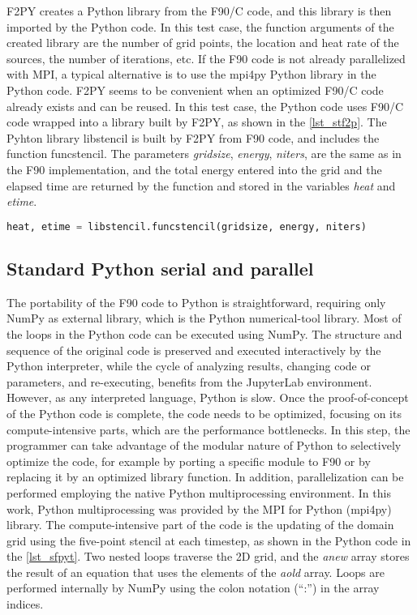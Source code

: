 F2PY creates a Python library from the F90/C code, and this library is then imported by the Python code. In this test case, the function arguments of the created library are the number of grid points, the location and heat rate of the sources, the number of iterations, etc. If the F90 code is not already parallelized with MPI, a typical alternative is to use the mpi4py Python library in the Python code. F2PY seems to be convenient when an optimized F90/C code already exists and can be reused. In this test case, the Python code uses F90/C code wrapped into a library built by F2PY, as shown in the \autoref {lst_stf2p}. The Pyhton library libstencil is built by F2PY from F90 code, and includes the function funcstencil. The parameters \textit {gridsize}, \textit {energy}, \textit {niters}, are the same as in the F90 implementation, and the total energy entered into the grid and the elapsed time are returned by the function and stored in the variables \textit {heat} and \textit {etime}.

\begin{lstlisting}[float=hbt, language=Python, label={lst_stf2p}, caption={Compute-intensive part of the F2PY implementation, in the main Python code.}]
heat, etime = libstencil.funcstencil(gridsize, energy, niters)
\end{lstlisting}

%
%
%
\subsection{Standard Python serial and parallel} %
\label{sec_stenimplpy}

The portability of the F90 code to Python is straightforward, requiring only NumPy as external library, which is the Python numerical-tool library. Most of the loops in the Python code can be executed using NumPy. The structure and sequence of the original code is preserved and executed interactively by the Python interpreter, while the cycle of analyzing results, changing code or parameters, and re-executing, benefits from the JupyterLab environment. However, as any interpreted language, Python is slow. Once the proof-of-concept of the Python code is complete, the code needs to be optimized, focusing on its compute-intensive parts, which are the performance bottlenecks. In this step, the programmer can take advantage of the modular nature of Python to selectively optimize the code, for example by porting a specific module to F90 or by replacing it by an optimized library function. In addition, parallelization can be performed employing the native Python multiprocessing environment. In this work, Python multiprocessing was provided by the MPI for Python (mpi4py) library. The compute-intensive part of the code is the updating of the domain grid using the five-point stencil at each timestep, as shown in the Python code in the \autoref {lst_sfpyt}. Two nested loops traverse the 2D grid, and the \textit {anew} array stores the result of an equation that uses the elements of the \textit {aold} array. Loops are performed internally by NumPy using the colon notation (``:'') in the array indices.

